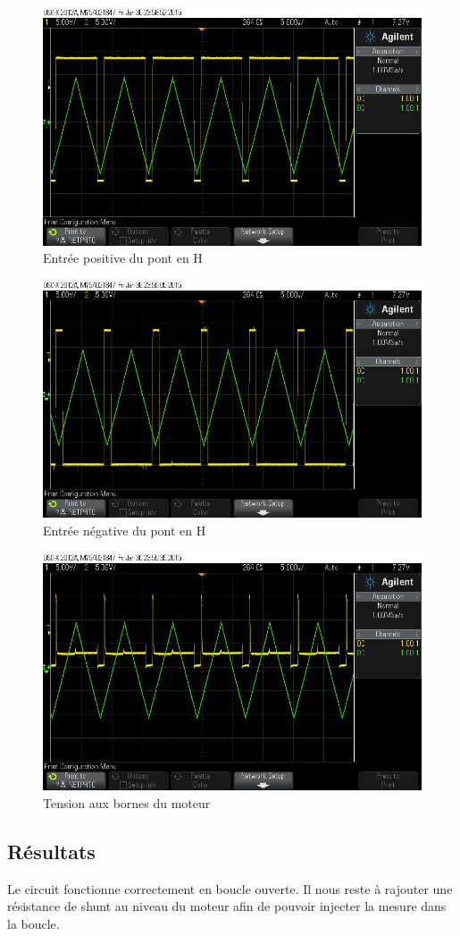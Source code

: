 \documentclass[a4paper]{article}
\begin{document}
\begin{figure}[H]
  \centering
    \includegraphics[width=1\textwidth]{scope_1}
  \caption{Entrée positive du pont en H}
\end{figure}

\begin{figure}[H]
  \centering
    \includegraphics[width=1\textwidth]{scope_2}
  \caption{Entrée négative du pont en H}
\end{figure}

\begin{figure}[H]
  \centering
    \includegraphics[width=1\textwidth]{scope_3}
  \caption{Tension aux bornes du moteur}
\end{figure}

\subsection{Résultats}

Le circuit fonctionne correctement en boucle ouverte. Il nous reste à rajouter une résistance de shunt au niveau du moteur afin de pouvoir injecter la mesure dans la boucle.
\end{document}
